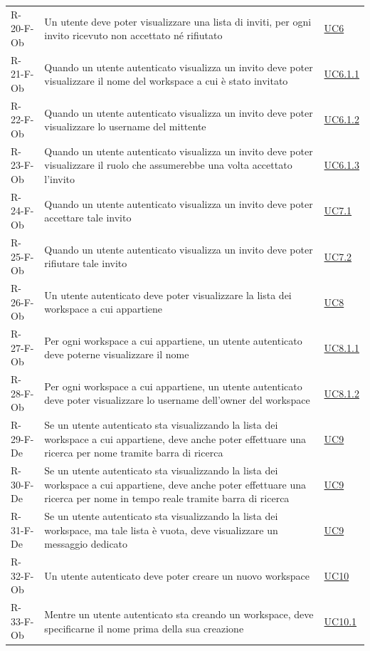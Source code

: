 \documentclass[a4paper, 11pt]{article}
\begin{document}
\begin{longtable}[c]{ >{\centering\arraybackslash}m{2.5cm} >{\centering\arraybackslash}m{8.3cm} >{\centering\arraybackslash}m{3.5cm} }
    R-20-F-Ob & Un utente deve poter visualizzare una lista di inviti, per ogni invito ricevuto non accettato né rifiutato &  \hyperref[UC6]{UC6}\\
    R-21-F-Ob & Quando un utente autenticato visualizza un invito deve poter visualizzare il nome del workspace a cui è stato invitato &  \hyperref[UC6.1.1]{UC6.1.1}\\
    R-22-F-Ob & Quando un utente autenticato visualizza un invito deve poter visualizzare lo username del mittente &  \hyperref[UC6.1.2]{UC6.1.2}\\
    R-23-F-Ob & Quando un utente autenticato visualizza un invito deve poter visualizzare il ruolo che assumerebbe una volta accettato l'invito &  \hyperref[UC6.1.3]{UC6.1.3}\\
    R-24-F-Ob & Quando un utente autenticato visualizza un invito deve poter accettare tale invito & \hyperref[UC7.1]{UC7.1}\\
    R-25-F-Ob & Quando un utente autenticato visualizza un invito deve poter rifiutare tale invito & \hyperref[UC7.2]{UC7.2}\\
    R-26-F-Ob & Un utente autenticato deve poter visualizzare la lista dei workspace a cui appartiene & \hyperref[UC8]{UC8}\\
    R-27-F-Ob & Per ogni workspace a cui appartiene, un utente autenticato deve poterne visualizzare il nome & \hyperref[UC8.1.1]{UC8.1.1}\\
    R-28-F-Ob & Per ogni workspace a cui appartiene, un utente autenticato deve poter visualizzare lo username dell'owner del workspace & \hyperref[UC8.1.2]{UC8.1.2}\\
    R-29-F-De & Se un utente autenticato sta visualizzando la lista dei workspace a cui appartiene, deve anche poter effettuare una ricerca per nome tramite barra di ricerca & \hyperref[UC9]{UC9}\\
    R-30-F-De & Se un utente autenticato sta visualizzando la lista dei workspace a cui appartiene, deve anche poter effettuare una ricerca per nome in tempo reale tramite barra di ricerca & \hyperref[UC9]{UC9}\\
    R-31-F-De & Se un utente autenticato  sta visualizzando la lista dei workspace, ma tale lista è vuota, deve visualizzare un messaggio dedicato & \hyperref[UC9]{UC9}\\
    R-32-F-Ob & Un utente autenticato deve poter creare un nuovo workspace & \hyperref[UC10]{UC10}\\
    R-33-F-Ob & Mentre un utente autenticato sta creando un workspace, deve specificarne il nome prima della sua creazione & \hyperref[UC10.1]{UC10.1}\\

\end{longtable}
\end{document}
